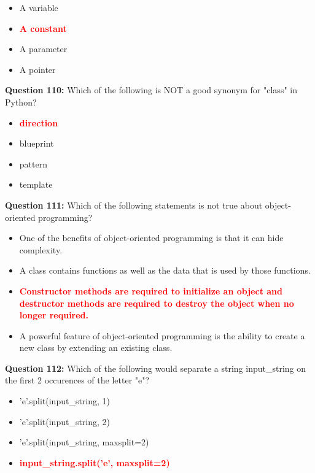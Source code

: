 \documentclass[12pt,a4paper]{article}
\begin{document}
\begin{itemize}
    \item[\textbf{A.}] A variable
    \item[\textbf{B.}] \textcolor{red}{\textbf{A constant}}
    \item[\textbf{C.}] A parameter
    \item[\textbf{D.}] A pointer
\end{itemize}

\vspace{0.5cm}

\textbf{Question 110:} Which of the following is NOT a good synonym for "class" in Python?

\begin{itemize}
    \item[\textbf{A.}] \textcolor{red}{\textbf{direction}}
    \item[\textbf{B.}] blueprint
    \item[\textbf{C.}] pattern
    \item[\textbf{D.}] template
\end{itemize}

\vspace{0.5cm}

\textbf{Question 111:} Which of the following statements is not true about object-oriented programming?

\begin{itemize}
    \item[\textbf{A.}] One of the benefits of object-oriented programming is that it can hide complexity.
    \item[\textbf{B.}] A class contains functions as well as the data that is used by those functions.
    \item[\textbf{C.}] \textcolor{red}{\textbf{Constructor methods are required to initialize an object and destructor methods are required to destroy the object when no longer required.}}
    \item[\textbf{D.}] A powerful feature of object-oriented programming is the ability to create a new class by extending an existing class.
\end{itemize}

\vspace{0.5cm}

\textbf{Question 112:} Which of the following would separate a string input_string on the first 2 occurences of the letter "e"?

\begin{itemize}
    \item[\textbf{A.}] 'e'.split(input_string, 1)
    \item[\textbf{B.}] 'e'.split(input_string, 2)
    \item[\textbf{C.}] 'e'.split(input_string, maxsplit=2)
    \item[\textbf{D.}] \textcolor{red}{\textbf{input_string.split('e', maxsplit=2)}}
\end{itemize}
\end{document}
